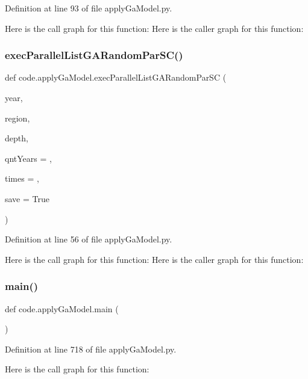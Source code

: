 Definition at line 93 of file apply\+Ga\+Model.\+py.

Here is the call graph for this function\+:
Here is the caller graph for this function\+:
\mbox{\label{namespacecode_1_1apply_ga_model_aed9039f3ef73e2b718ae62a0e2e40b0e}} 
\subsubsection{\texorpdfstring{exec\+Parallel\+List\+G\+A\+Random\+Par\+S\+C()}{execParallelListGARandomParSC()}}
{\footnotesize\ttfamily def code.\+apply\+Ga\+Model.\+exec\+Parallel\+List\+G\+A\+Random\+Par\+SC (\begin{DoxyParamCaption}\item[{}]{year,  }\item[{}]{region,  }\item[{}]{depth,  }\item[{}]{qnt\+Years = {},  }\item[{}]{times = {},  }\item[{}]{save = {\ttfamily True} }\end{DoxyParamCaption})}



Definition at line 56 of file apply\+Ga\+Model.\+py.

Here is the call graph for this function\+:
Here is the caller graph for this function\+:
\mbox{\label{namespacecode_1_1apply_ga_model_a245f2986f00dbb050a839ed2947a5780}} 
\subsubsection{\texorpdfstring{main()}{main()}}
{\footnotesize\ttfamily def code.\+apply\+Ga\+Model.\+main (\begin{DoxyParamCaption}{ }\end{DoxyParamCaption})}



Definition at line 718 of file apply\+Ga\+Model.\+py.

Here is the call graph for this function\+:
